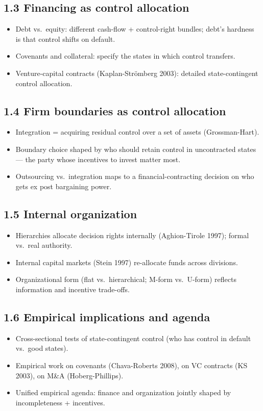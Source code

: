 \documentclass[11pt]{article}
\begin{document}
\subsection*{1.3 Financing as control allocation}
\begin{itemize}
\item Debt vs.\ equity: different cash-flow + control-right bundles; debt's hardness is that control shifts on default.
\item Covenants and collateral: specify the states in which control transfers.
\item Venture-capital contracts (Kaplan-Strömberg 2003): detailed state-contingent control allocation.
\end{itemize}

\subsection*{1.4 Firm boundaries as control allocation}
\begin{itemize}
\item Integration = acquiring residual control over a set of assets (Grossman-Hart).
\item Boundary choice shaped by who should retain control in uncontracted states --- the party whose incentives to invest matter most.
\item Outsourcing vs.\ integration maps to a financial-contracting decision on who gets ex post bargaining power.
\end{itemize}

\subsection*{1.5 Internal organization}
\begin{itemize}
\item Hierarchies allocate decision rights internally (Aghion-Tirole 1997); formal vs.\ real authority.
\item Internal capital markets (Stein 1997) re-allocate funds across divisions.
\item Organizational form (flat vs.\ hierarchical; M-form vs.\ U-form) reflects information and incentive trade-offs.
\end{itemize}

\subsection*{1.6 Empirical implications and agenda}
\begin{itemize}
\item Cross-sectional tests of state-contingent control (who has control in default vs.\ good states).
\item Empirical work on covenants (Chava-Roberts 2008), on VC contracts (KS 2003), on M\&A (Hoberg-Phillips).
\item Unified empirical agenda: finance and organization jointly shaped by incompleteness + incentives.
\end{itemize}
\end{document}
